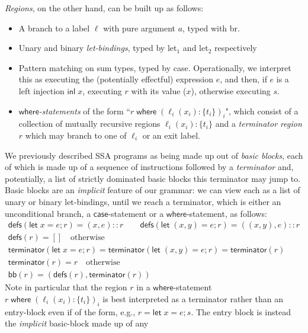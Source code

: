 \documentclass[acmsmall,screen,review]{acmart}
\newcommand{\ms}[1]{\ensuremath{\mathsf{#1}}}
\newcommand{\lto}{:}
\newcommand{\letstmt}[3]{\ensuremath{\ms{let}\;#1 = #2; #3}}
\newcommand{\where}[2]{#1\;\ms{where}\;#2}
\newcommand{\wbranch}[3]{#1(#2) \lto \{#3\}}
\newcommand{\rle}[1]{{\scriptsize\textsf{#1}}}
\newcommand{\brle}[1]{{\scriptsize\textsf{#1}}}
\begin{document}
\emph{Regions}, on the other hand, can be built up as follows:
\begin{itemize}
  \item A branch to a label $\ell$ with pure argument $a$, typed with \rle{br}.
  
  \item Unary and binary \emph{let-bindings}, typed by \brle{let$_1$} and \brle{let$_2$}
  respectively
  
  \item Pattern matching on sum types, typed by \brle{case}. Operationally, we interpret this as
  executing the (potentially effectful) expression $e$, and then, if $e$ is a left injection
  $\ms{inl}\;x$, executing $r$ with its value ($x$), otherwise executing $s$.
  
  \item \emph{\ms{where}-statements} of the form
  ``$\where{r}{(\wbranch{\ell_i}{x_i}{t_i})_i}$", which consist of a collection
  of mutually recursive regions $\wbranch{\ell_i}{x_i}{t_i}$ and a \emph{terminator
  region} $r$ which may branch to one of $\ell_i$ or an exit label.
\end{itemize}
We previously described SSA programs as being made up out of \emph{basic
blocks}, each of which is made up of a sequence of instructions followed by a
\emph{terminator} and, potentially, a list of strictly dominated basic blocks
this terminator may jump to. Basic blocks are an \emph{implicit} feature of our
grammar: we can view each as a list of unary or binary let-bindings, until we
reach a terminator, which is either an unconditional branch, a
\ms{case}-statement or a \ms{where}-statement, as follows:
\begin{gather*}
  \ms{defs}(\letstmt{x}{e}{r}) = (x, e)::r \qquad 
  \ms{defs}(\letstmt{(x, y)}{e}{r}) = ((x, y), e)::r \\
  \ms{defs}(r) = [] \quad \text{otherwise} \\
  \ms{terminator}(\letstmt{x}{e}{r}) 
  = \ms{terminator}(\letstmt{(x, y)}{e}{r}) 
  = \ms{terminator}(r) \\
  \ms{terminator}(r) = r \quad \text{otherwise} \\
  \ms{bb}(r) = (\ms{defs}(r), \ms{terminator}(r))
\end{gather*}
Note in particular that the region $r$ in a \ms{where}-statement
$\where{r}{(\wbranch{\ell_i}{x_i}{t_i})_i}$ is best interpreted as a terminator
rather than an entry-block even if of the form, e.g., $r = \letstmt{x}{e}{s}$.
The entry block is instead the \emph{implicit} basic-block made up of any
\end{document}
